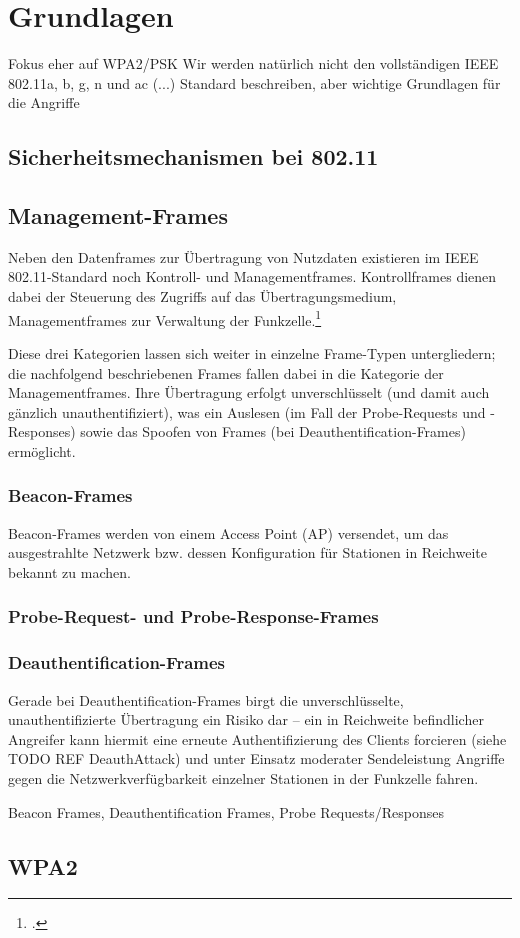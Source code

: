 \section{Grundlagen}
Fokus eher auf WPA2/PSK
Wir werden natürlich nicht den vollständigen IEEE 802.11a, b, g, n und ac (...) Standard beschreiben, aber wichtige Grundlagen für die Angriffe
\subsection{Sicherheitsmechanismen bei 802.11}

\subsection{Management-Frames}
Neben den Datenframes zur Übertragung von Nutzdaten existieren im IEEE 802.11-Standard noch Kontroll- und Managementframes. Kontrollframes dienen dabei der Steuerung des Zugriffs auf das Übertragungsmedium, Managementframes zur Verwaltung der Funkzelle.\footcite[S. 180]{rechWLAN}

Diese drei Kategorien lassen sich weiter in einzelne Frame-Typen untergliedern; die nachfolgend beschriebenen Frames fallen dabei in die Kategorie der Managementframes. Ihre Übertragung erfolgt unverschlüsselt (und damit auch gänzlich unauthentifiziert), was ein Auslesen (im Fall der Probe-Requests und -Responses) sowie das Spoofen von Frames (bei Deauthentification-Frames) ermöglicht.

\subsubsection{Beacon-Frames}
Beacon-Frames werden von einem Access Point (AP) versendet, um das ausgestrahlte Netzwerk bzw. dessen Konfiguration für Stationen in Reichweite bekannt zu machen. 
\subsubsection{Probe-Request- und Probe-Response-Frames}

\subsubsection{Deauthentification-Frames}

Gerade bei Deauthentification-Frames birgt die unverschlüsselte, unauthentifizierte Übertragung ein Risiko dar -- ein in Reichweite befindlicher Angreifer kann hiermit eine erneute Authentifizierung des Clients forcieren (siehe TODO REF DeauthAttack) und unter Einsatz moderater Sendeleistung Angriffe gegen die Netzwerkverfügbarkeit einzelner Stationen in der Funkzelle fahren.

Beacon Frames, Deauthentification Frames, Probe Requests/Responses

\subsection{WPA2}